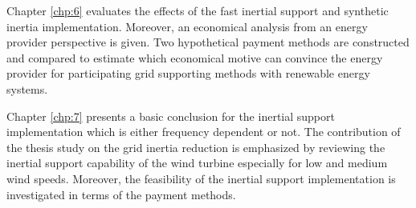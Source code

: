 Chapter \ref{chp:6} evaluates the effects of the fast inertial support and synthetic inertia implementation. Moreover, an economical analysis from an energy provider perspective is given. Two hypothetical payment methods are constructed and compared to estimate which economical motive can convince the energy provider for participating grid supporting methods with renewable energy systems. \par
Chapter \ref{chp:7} presents a basic conclusion for the inertial support implementation which is either frequency dependent or not. The contribution of the thesis study on the grid inertia reduction is emphasized by reviewing the inertial support capability of the wind turbine especially for low and medium wind speeds. Moreover, the feasibility of the inertial support implementation is investigated in terms of the payment methods.

















